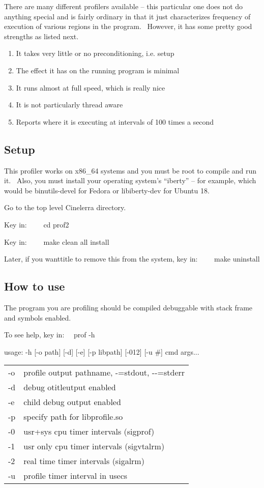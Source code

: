 There are many different profilers available -- this particular one does not do anything special and is fairly ordinary in that it just characterizes frequency of execution of various regions in the program. \ However, it has some pretty good strengths as listed next.
\medskip
\begin{enumerate}[nosep]
	\item It takes very little or no preconditioning, i.e. setup
	\item The effect it has on the running program is minimal
	\item It runs almost at full speed, which is really nice
	\item It is not particularly thread aware
	\item Reports where it is executing at intervals of 100 times a second
\end{enumerate}
\subsection{Setup}

This profiler works on x86\_64 systems and you must be root to compile and run it. \ Also, you must install your operating system's ``iberty'' -- for example, which would be binutils-devel for Fedora or libiberty-dev for Ubuntu 18.
\medskip

Go to the top level Cinelerra directory.

Key in: \ \ \ \ cd prof2

Key in: \ \ \ \ make clean all install

Later, if you wanttitle to remove this from the system, key in: \ \ \ \ make uninstall
\subsection{How to use}

The program you are profiling should be compiled debuggable with stack frame and symbols enabled.
\medskip

To see help, key in: \ \ prof -h
\smallskip

usage: -h [-o path] [-d] [-e] [-p libpath] [-012] [-u \#] cmd args...

\hspace{2em}
\begin{tabular}{@{}ll}
	-o & profile output pathname, -=stdout, -{}-=stderr\\
	-d & debug otitleutput enabled\\
	-e & child debug output enabled\\
	-p & specify path for libprofile.so\\
	-0 & usr+sys cpu timer intervals (sigprof)\\
	-1 & usr only cpu timer intervals (sigvtalrm)\\
	-2 & real time timer intervals (sigalrm)\\
	-u & profile timer interval in usecs\\
\end{tabular}
\medskip

